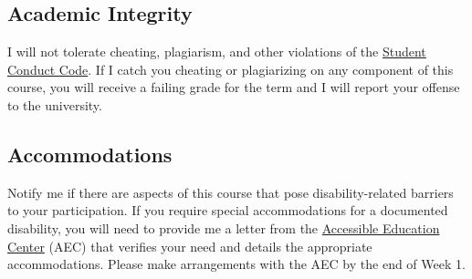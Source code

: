 \documentclass[11pt]{article}
\begin{document}
\subsection*{Academic Integrity} 

I will not tolerate cheating, plagiarism, and other violations of the \href{https://studentlife.uoregon.edu/conduct}{Student Conduct Code}. If I catch you cheating or plagiarizing on any component of this course, you will receive a failing grade for the term and I will report your offense to the university. 

\subsection*{Accommodations} 

Notify me if there are aspects of this course that pose disability-related barriers to your participation. If you require special accommodations for a documented disability, you will need to provide me a letter from the \href{https://aec.uoregon.edu/}{Accessible Education Center} (AEC) that verifies your need and details the appropriate accommodations. Please make arrangements with the AEC by the end of Week 1. %

\newpage



\newpage
\end{document}
